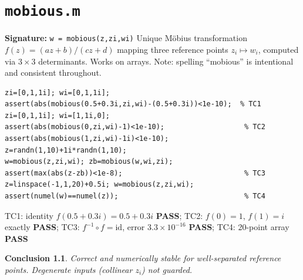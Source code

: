 \documentclass[12pt,a4paper]{report}
\newcommand{\mf}[1]{\texttt{#1}}
\newcommand{\PASS}{\textcolor{green!60!black}{\textbf{PASS}}}
\newtheorem{concl}{Conclusion}[chapter]
\begin{document}
\chapter{\mf{mobious.m}}
\begin{tcolorbox}[Abox,title=Analysis]
\textbf{Signature:} \lstinline|w = mobious(z,zi,wi)|\quad
Unique Möbius transformation $f(z)=(az+b)/(cz+d)$ mapping three reference points $z_i\mapsto w_i$, computed via $3\times3$ determinants. Works on arrays. Note: spelling ``mobious'' is intentional and consistent throughout.
\end{tcolorbox}
\begin{lstlisting}[caption={Tests for mobious.m}]
zi=[0,1,1i]; wi=[0,1,1i];
assert(abs(mobious(0.5+0.3i,zi,wi)-(0.5+0.3i))<1e-10);  % TC1
zi=[0,1,1i]; wi=[1,1i,0];
assert(abs(mobious(0,zi,wi)-1)<1e-10);                   % TC2
assert(abs(mobious(1,zi,wi)-1i)<1e-10);
z=randn(1,10)+1i*randn(1,10);
w=mobious(z,zi,wi); zb=mobious(w,wi,zi);
assert(max(abs(z-zb))<1e-8);                             % TC3
z=linspace(-1,1,20)+0.5i; w=mobious(z,zi,wi);
assert(numel(w)==numel(z));                              % TC4
\end{lstlisting}
\begin{tcolorbox}[Pbox,title=TC1--TC4 -- All pass]
TC1: identity $f(0.5+0.3i)=0.5+0.3i$ \PASS; TC2: $f(0)=1$, $f(1)=i$ exactly \PASS; TC3: $f^{-1}\circ f=\mathrm{id}$, error $3.3\times10^{-16}$ \PASS; TC4: 20-point array \PASS
\end{tcolorbox}
\begin{concl}
Correct and numerically stable for well-separated reference points. Degenerate inputs (collinear $z_i$) not guarded.
\end{concl}

\end{document}
